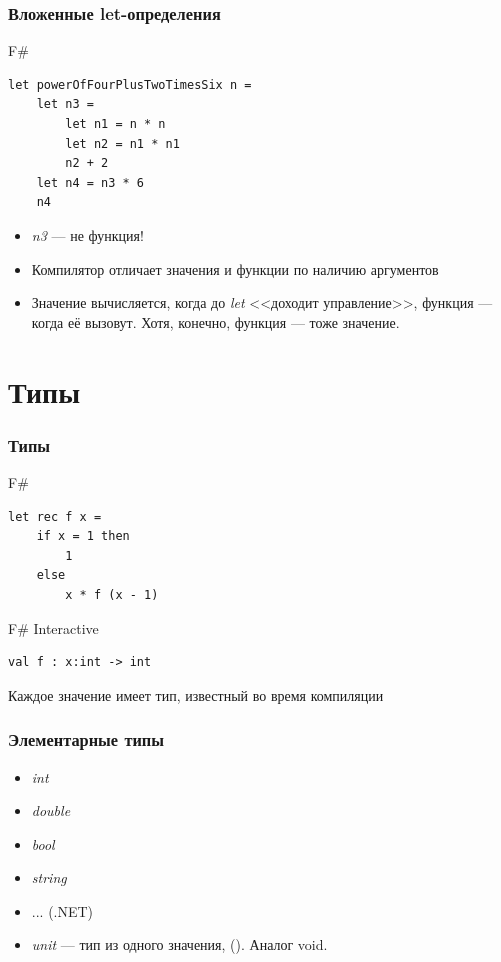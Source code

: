 \documentclass[xetex,mathserif,serif]{beamer}
\begin{document}
	\begin{frame}[fragile]
		\frametitle{Вложенные let-определения}
		\begin{exampleblock}{F\#}
			\begin{lstlisting}
let powerOfFourPlusTwoTimesSix n =
    let n3 =
        let n1 = n * n
        let n2 = n1 * n1
        n2 + 2
    let n4 = n3 * 6
    n4
            \end{lstlisting}
		\end{exampleblock}
		\begin{itemize}
			\item \textit{n3} --- не функция!
			\item Компилятор отличает значения и функции по наличию аргументов
			\item Значение вычисляется, когда до \textit{let} <<доходит управление>>, 
					функция --- когда её вызовут. Хотя, конечно, функция --- тоже значение.
		\end{itemize}
\end{frame}
			
	\section{Типы}
			
	\begin{frame}[fragile]
		\frametitle{Типы}
		\begin{exampleblock}{F\#}
			\begin{lstlisting}
let rec f x =
    if x = 1 then 
        1 
    else 
        x * f (x - 1)
            \end{lstlisting}
		\end{exampleblock}

		\begin{alertblock}{F\# Interactive}
			\begin{lstlisting}
val f : x:int -> int
            \end{lstlisting}
        \end{alertblock}
        Каждое значение имеет тип, известный во время компиляции
\end{frame}
			
	\begin{frame}
		\frametitle{Элементарные типы}
		\begin{itemize}
			\item \textit{int}
			\item \textit{double}
			\item \textit{bool}
			\item \textit{string}
			\item ... (.NET)
			\item \textit{unit} --- тип из одного значения, (). Аналог void.
		\end{itemize}
	\end{frame}
	
\end{document}
